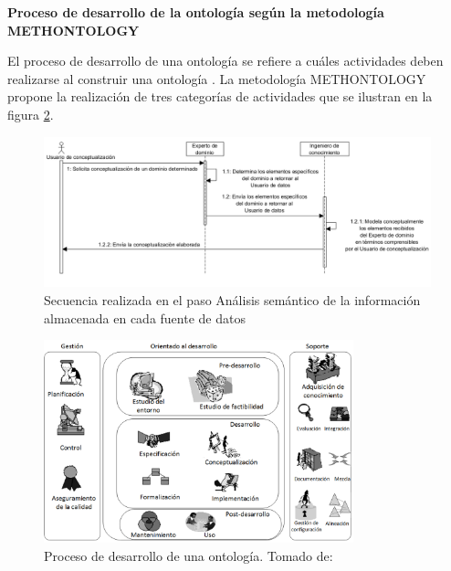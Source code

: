 \textbf{Proceso de desarrollo de la ontología según la metodología METHONTOLOGY}


El proceso de desarrollo de una ontología se refiere a cuáles actividades deben realizarse al construir una ontología \citep{Gomez-Perez:2007:OEE:1199560}. La metodología METHONTOLOGY propone la realización de tres categorías de actividades que se ilustran en la figura \ref{fig: methontology}.

\begin{figure}
\begin{center}
	\includegraphics[width=1\textwidth]{img/conceptsExtraction.png}
\end{center}
\caption{Secuencia realizada en el paso Análisis semántico de la información almacenada en cada fuente de datos}
\label{fig: conceptsExtraction}
\end{figure}

\begin{figure}
\begin{center}
	\includegraphics[width=0.8\textwidth]{img/Diagrama_METHONTOLOGY.png}
\end{center}
\caption{Proceso de desarrollo de una ontología. Tomado de: \citep{Gomez-Perez:2007:OEE:1199560}}
\label{fig: methontology}
\end{figure}

